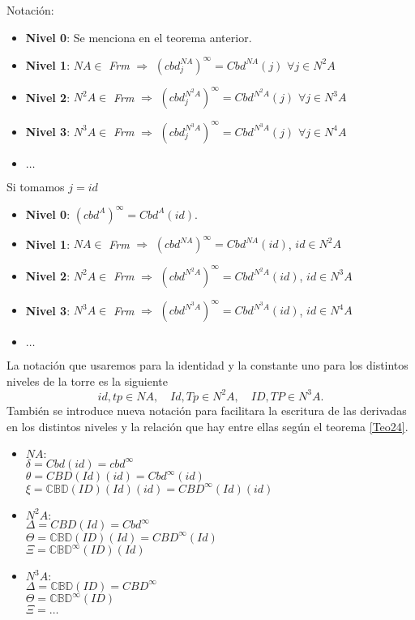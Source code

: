 \begin{description}
\item[Notación:]
\end{description}
\begin{itemize}
\item \textbf{Nivel 0}: Se menciona en el teorema anterior.
\item \textbf{Nivel 1}: $NA\in$ \textit{Frm} $\Rightarrow$ $(cbd_j^{NA})^\infty=Cbd^{NA}(j)$ $\forall j\in N^2A$
\item \textbf{Nivel 2}: $N^2A\in$ \textit{Frm} $\Rightarrow$ $(cbd_j^{N^2A})^\infty=Cbd^{N^2A}(j)$ $\forall j\in N^3A$
\item \textbf{Nivel 3}: $N^3A\in$ \textit{Frm} $\Rightarrow$ $(cbd_j^{N^3A})^\infty=Cbd^{N^3A}(j)$ $\forall j\in N^4A$
\item $\ldots$
\end{itemize}

Si tomamos $j=id$ 
\begin{itemize}
\item \textbf{Nivel 0}: $(cbd^A)^\infty=Cbd^A(id)$.
\item \textbf{Nivel 1}: $NA\in$ \textit{Frm} $\Rightarrow$ $(cbd^{NA})^\infty=Cbd^{NA}(id)$, $id\in N^2A$
\item \textbf{Nivel 2}: $N^2A\in$ \textit{Frm} $\Rightarrow$ $(cbd^{N^2A})^\infty=Cbd^{N^2A}(id)$, $id\in N^3A$
\item \textbf{Nivel 3}: $N^3A\in$ \textit{Frm} $\Rightarrow$ $(cbd^{N^3A})^\infty=Cbd^{N^3A}(id)$,  $id\in N^4A$
\item $\ldots$
\end{itemize}

La notación que usaremos para la identidad y la constante uno para los distintos niveles de la torre es la siguiente $$id, tp\in NA,\quad Id,Tp\in N^2A,\quad ID, TP\in N^3A.$$
También se introduce nueva notación para facilitara la escritura de las derivadas en los distintos niveles y la relación que hay entre ellas según el teorema \ref{Teo24}.
\begin{itemize}
\item \textbf{$NA:$}\\
$\delta=Cbd(id)=cbd^\infty$\\
$\theta=CBD(Id)(id)=Cbd^\infty(id)$\\
$\xi =\mathbb{CBD}(ID)(Id)(id)=CBD^\infty(Id)(id)$

\item \textbf{$N^2A:$}\\
$\Delta =CBD(Id)=Cbd^\infty$\\
$\Theta =\mathbb{CBD}(ID)(Id)=CBD^\infty(Id)$\\
$\Xi =\mathbb{CBD}^\infty(ID)(Id)$

\item \textbf{$N^3A:$}\\
$\Delta=\mathbb{CBD}(ID)=CBD^\infty$\\
$\Theta=\mathbb{CBD}^\infty(ID)$\\
$\Xi=\ldots$
\end{itemize}

